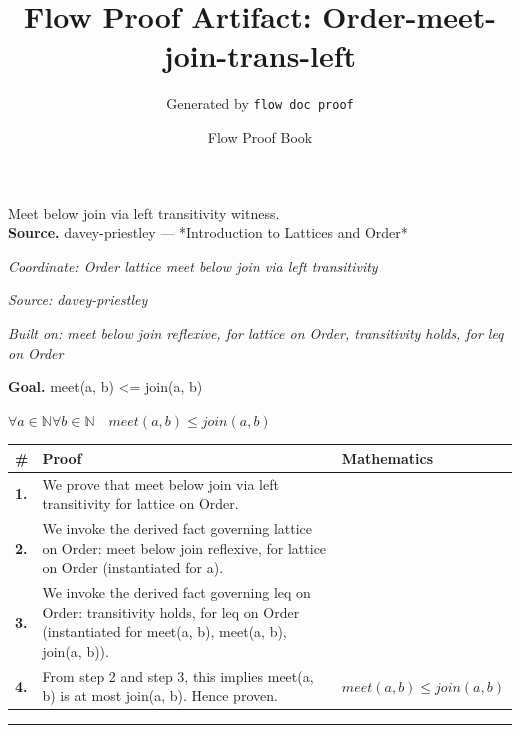 \documentclass[11pt]{article}
\title{Flow Proof Artifact: Order-meet-join-trans-left}
\author{Generated by \texttt{flow doc proof}}
\date{Flow Proof Book}
\theoremstyle{definition}
\begin{document}
\maketitle
Meet below join via left transitivity witness.\\[0.5em]
\textbf{Source.} davey-priestley — *Introduction to Lattices and Order*\\[0.5em]
\bigskip
{}\par
\smallskip\noindent\textit{Coordinate: Order \cdot lattice \cdot meet below join via left transitivity}\par
\smallskip\noindent\textit{Source: davey-priestley}\par
\smallskip\noindent\textit{Built on: meet below join reflexive, for lattice on Order, transitivity holds, for leq on Order}\par
\medskip
\noindent\textbf{Goal.} meet(a, b) <= join(a, b)\par
\noindent$\displaystyle \forall a \in \mathbb{N} \forall b \in \mathbb{N}\quad meet(a, b) \le join(a, b)$\par
\medskip
\noindent
\begin{tabular}{@{} >{\raggedright\arraybackslash}p{} >{\raggedright\arraybackslash}p{} >{\raggedleft\arraybackslash}p{} @{}}
\textbf{\#} & \textbf{Proof} & \textbf{Mathematics} \\
\midrule
\textbf{1.} & We prove that meet below join via left transitivity for lattice on Order. & \\[0.45em]
\textbf{2.} & We invoke the derived fact governing lattice on Order: meet below join reflexive, for lattice on Order (instantiated for a). & \\[0.45em]
\textbf{3.} & We invoke the derived fact governing leq on Order: transitivity holds, for leq on Order (instantiated for meet(a, b), meet(a, b), join(a, b)). & \\[0.45em]
\textbf{4.} & From step 2 and step 3, this implies meet(a, b) is at most join(a, b). Hence proven. & $\displaystyle meet(a, b) \le join(a, b)$ \\[0.45em]
\bottomrule
\end{tabular}
\label{thm:Order-lattice-meet_below_join_via_left_transitivity}
\par\medskip\hrule
\end{document}
